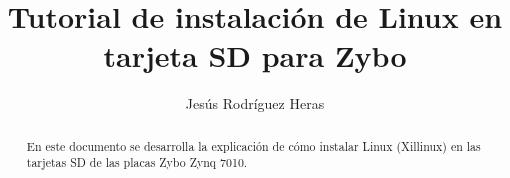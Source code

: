 \documentclass[12pt,letterpaper]{article}
\title{Tutorial de instalación de Linux en tarjeta SD para Zybo}
\author{Jesús Rodríguez Heras}
\begin{document}
	
	\maketitle
	\begin{abstract} %
		\begin{center}
			En este documento se desarrolla la explicación de cómo instalar Linux (Xillinux) en las tarjetas SD de las placas Zybo Zynq 7010.
		\end{center}
	\end{abstract}
	\thispagestyle{empty}
	\newpage
	
	\tableofcontents
	\newpage
	
	
	
	
	\lstset{language=bash, numbers=left, numberstyle=\tiny, numbersep=10pt, firstnumber=1, stepnumber=1, basicstyle=\small\ttfamily, tabsize=1, extendedchars=true, inputencoding=latin1}
\end{document}
